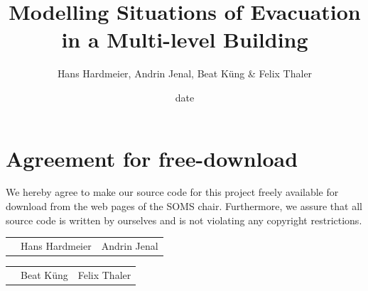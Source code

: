 \documentclass[11pt]{article}
\title{Modelling Situations of Evacuation in a Multi-level Building}
\author{Hans Hardmeier, Andrin Jenal, Beat K\"ung & Felix Thaler}
\date{date}
\begin{document}

\newpage


\newpage
\section*{Agreement for free-download}
\bigskip


\bigskip


\large We hereby agree to make our source code for this project freely available for download from the web pages of the SOMS chair. Furthermore, we assure that all source code is written by ourselves and is not violating any copyright restrictions.

\begin{center}

\bigskip
\bigskip
\bigskip
\bigskip


\begin{tabular}{@{}p{3.3cm}@{}p{6cm}@{}@{}p{6cm}@{}}

\begin{minipage}{3cm}

\end{minipage}
&
\begin{minipage}{6cm}
\vspace{2mm} \large Hans Hardmeier

 \vspace{\baselineskip}

\end{minipage}
&
\begin{minipage}{6cm}

\large Andrin Jenal

\end{minipage}

\end{tabular}

\bigskip
\bigskip
\bigskip
\bigskip


\begin{tabular}{@{}p{3.3cm}@{}p{6cm}@{}@{}p{6cm}@{}}

\begin{minipage}{3cm}

\end{minipage}
&
\begin{minipage}{6cm}
\vspace{2mm} \large Beat K\"ung

 \vspace{\baselineskip}

\end{minipage}
&
\begin{minipage}{6cm}

\large Felix Thaler

\end{minipage}
\end{tabular}

\end{center}
\newpage
\end{document}
